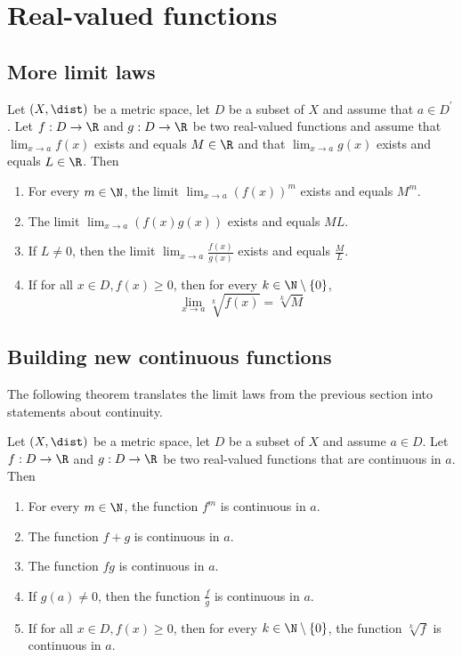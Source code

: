 \section{Real-valued functions}

\subsection{More limit laws}
\begin{theorem}
    Let $(X, \dist)$ be a metric space, let $D$ be a subset of $X$ and assume that $a \in D^\prime$. Let 
    $f: D \to \R$ and $g: D \to \R$ be two real-valued functions and assume that $\lim_{x\to a}f(x)$ exists and
    equals $M \in \R$ and that $\lim_{x\to a}g(x)$ exists and equals $L \in \R$. Then
    \begin{enumerate}
        \item For every $m \in \N$, the limit $\lim_{x\to a}(f(x))^m$ exists and equals $M^m$.
        \item The limit $\lim_{x \to a}(f(x)g(x))$ exists and equals $ML$.
        \item If $L \ne 0$, then the limit $\lim_{x \to a}\frac{f(x)}{g(x)}$ exists and equals $\frac{M}{L}$.
        \item If for all $x \in D, f(x) \ge 0$, then for every $k \in \N \setminus \{0\}$,
            $$\lim_{x\to a}\sqrt[k]{f(x)}=\sqrt[k]{M}$$
    \end{enumerate}
\end{theorem}

\subsection{Building new continuous functions}
The following theorem translates the limit laws from the previous section into statements
about continuity.
\begin{theorem}
    Let $(X,\dist)$ be a metric space, let $D$ be a subset of $X$ and assume $a \in D$.
    Let $f:D \to \R$ and $g:D \to \R$ be two real-valued functions that are continuous in $a$.
    Then 
    \begin{enumerate}
        \item For every $m \in \N$, the function $f^m$ is continuous in $a$.
        \item The function $f + g$ is continuous in $a$.
        \item The function $fg$ is continuous in $a$. 
        \item If $g(a) \ne 0$, then the function $\frac{f}{g}$ is continuous in $a$.
        \item If for all $x \in D, f(x) \ge 0$, then for every $k \in \N \setminus \{0\}$,
            the function $\sqrt[k]{f}$ is continuous in $a$.
    \end{enumerate}
\end{theorem}

